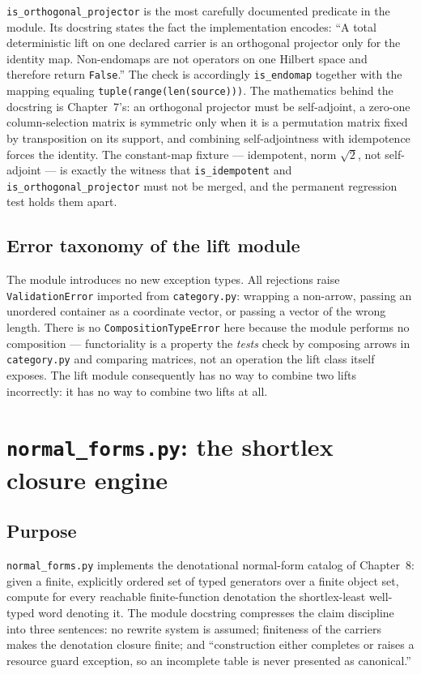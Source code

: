 \texttt{is\_orthogonal\_projector} is the most carefully documented
predicate in the module. Its docstring states the fact the implementation
encodes: ``A total deterministic lift on one declared carrier is an
orthogonal projector only for the identity map. Non-endomaps are not
operators on one Hilbert space and therefore return \texttt{False}.'' The
check is accordingly \texttt{is\_endomap} together with the mapping equaling
\texttt{tuple(range(len(source)))}. The mathematics behind the docstring is
Chapter~7's: an orthogonal projector must be self-adjoint, a zero-one
column-selection matrix is symmetric only when it is a permutation matrix
fixed by transposition on its support, and combining self-adjointness with
idempotence forces the identity. The constant-map fixture --- idempotent,
norm $\sqrt{2}$, not self-adjoint --- is exactly the witness that
\texttt{is\_idempotent} and \texttt{is\_orthogonal\_projector} must not be
merged, and the permanent regression test holds them apart.

\subsection{Error taxonomy of the lift module}

The module introduces no new exception types. All rejections raise
\texttt{ValidationError} imported from \texttt{category.py}: wrapping a
non-arrow, passing an unordered container as a coordinate vector, or
passing a vector of the wrong length. There is no
\texttt{CompositionTypeError} here because the module performs no
composition --- functoriality is a property the \emph{tests} check by
composing arrows in \texttt{category.py} and comparing matrices, not an
operation the lift class itself exposes. The lift module consequently has
no way to combine two lifts incorrectly: it has no way to combine two
lifts at all.

\section{\texttt{normal\_forms.py}: the shortlex closure engine}\label{ch09:sec:nf}

\subsection{Purpose}

\texttt{normal\_forms.py} implements the denotational normal-form catalog
of Chapter~8: given a finite, explicitly ordered set of typed generators
over a finite object set, compute for every reachable finite-function
denotation the shortlex-least well-typed word denoting it. The module
docstring compresses the claim discipline into three sentences: no rewrite
system is assumed; finiteness of the carriers makes the denotation closure
finite; and ``construction either completes or raises a resource guard
exception, so an incomplete table is never presented as canonical.''

